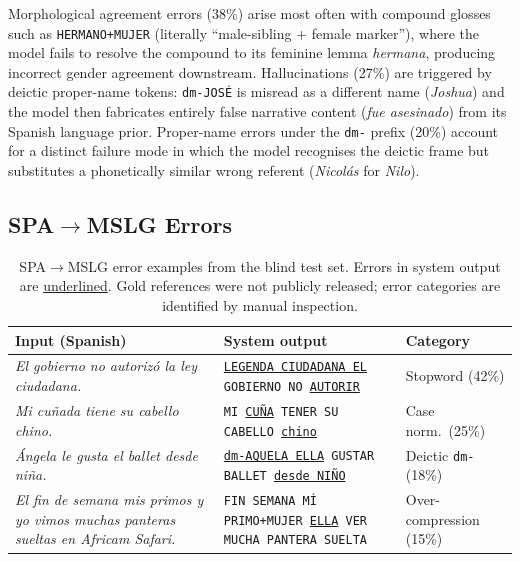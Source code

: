 \documentclass[sigconf,screen]{ceurart}
\begin{document}
Morphological agreement errors (38\%) arise most often with compound
glosses such as \texttt{HERMANO+MUJER} (literally ``male-sibling +
female marker''), where the model fails to resolve the compound to
its feminine lemma \textit{hermana}, producing incorrect gender
agreement downstream.
Hallucinations (27\%) are triggered by deictic proper-name tokens:
\texttt{dm-JOS\'E} is misread as a different name (\textit{Joshua})
and the model then fabricates entirely false narrative content
(\textit{fue asesinado}) from its Spanish language prior.
Proper-name errors under the \texttt{dm-} prefix (20\%) account
for a distinct failure mode in which the model recognises the
deictic frame but substitutes a phonetically similar wrong referent
(\textit{Nicol\'as} for \textit{Nilo}).

\subsection{SPA$\!\to\!$MSLG Errors}

\begin{table}[h]
\centering
\small
\caption{SPA$\!\to\!$MSLG error examples from the blind test set.
  Errors in system output are \underline{underlined}.
  Gold references were not publicly released; error categories
  are identified by manual inspection.}
\label{tab:errors_s2m}
\begin{tabular}{p{5.5cm}p{7cm}p{2cm}}
\toprule
\textbf{Input (Spanish)} & \textbf{System output} & \textbf{Category} \\
\midrule
\textit{El gobierno no autoriz\'o la ley ciudadana.} &
  \texttt{\underline{LEGENDA CIUDADANA EL} GOBIERNO NO \underline{AUTORIR}} &
  Stopword (42\%) \\
\midrule
\textit{Mi cu\~nada tiene su cabello chino.} &
  \texttt{MI \underline{CU\~NA} TENER SU CABELLO \underline{chino}} &
  Case norm.\ (25\%) \\
\midrule
\textit{\'Angela le gusta el ballet desde ni\~na.} &
  \texttt{\underline{dm-AQUELA ELLA} GUSTAR BALLET \underline{desde NI\~NO}} &
  Deictic \texttt{dm-} (18\%) \\
\midrule
\textit{El fin de semana mis primos y yo vimos muchas panteras sueltas en Africam Safari.} &
  \texttt{FIN SEMANA M\'I PRIMO+MUJER \underline{ELLA} VER MUCHA PANTERA SUELTA} &
  Over-compression (15\%) \\
\bottomrule
\end{tabular}
\end{table}
\end{document}
